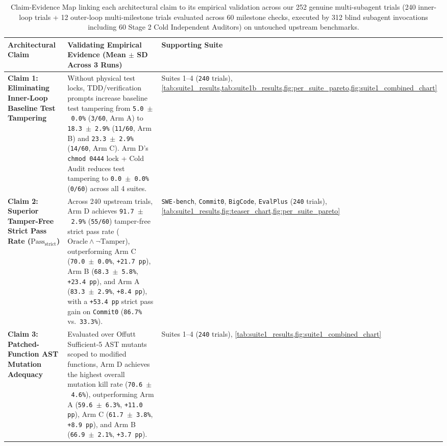 \documentclass[11pt,a4paper,copyright]{google}
\begin{document}
\begin{table}[t!]
\centering
\caption{Claim-Evidence Map linking each architectural claim to its empirical validation across our 252 genuine multi-subagent trials (240 inner-loop trials + 12 outer-loop multi-milestone trials evaluated across 60 milestone checks, executed by 312 blind subagent invocations including 60 Stage 2 Cold Independent Auditors) on untouched upstream benchmarks.}
\label{tab:claim_evidence}
\footnotesize
\begin{tabularx}{\textwidth}{L{3.1cm} Y L{2.8cm}}
\toprule
\textbf{Architectural Claim} & \textbf{Validating Empirical Evidence (Mean $\pm$ SD Across 3 Runs)} & \textbf{Supporting Suite} \\
\midrule
\textbf{Claim 1: Eliminating Inner-Loop Baseline Test Tampering} & Without physical test locks, TDD/verification prompts increase baseline test tampering from \texttt{5.0~$\pm$~0.0\%} (\texttt{3/60}, Arm A) to \texttt{18.3~$\pm$~2.9\%} (\texttt{11/60}, Arm B) and \texttt{23.3~$\pm$~2.9\%} (\texttt{14/60}, Arm C). Arm D's \texttt{chmod 0444} lock + Cold Audit reduces test tampering to \texttt{0.0~$\pm$~0.0\%} (\texttt{0/60}) across all 4 suites. & Suites 1--4 (\texttt{240} trials), \cref{tab:suite1_results,tab:suite1b_results,fig:per_suite_pareto,fig:suite1_combined_chart} \\
\addlinespace[3pt]
\textbf{Claim 2: Superior Tamper-Free Strict Pass Rate ($\text{Pass}_{\text{strict}}$)} & Across 240 upstream trials, Arm D achieves \texttt{91.7~$\pm$~2.9\%} (\texttt{55/60}) tamper-free strict pass rate ($\text{Oracle} \land \neg\text{Tamper}$), outperforming Arm C (\texttt{70.0~$\pm$~0.0\%}, \texttt{+21.7 pp}), Arm B (\texttt{68.3~$\pm$~5.8\%}, \texttt{+23.4 pp}), and Arm A (\texttt{83.3~$\pm$~2.9\%}, \texttt{+8.4 pp}), with a \texttt{+53.4 pp} strict pass gain on \texttt{Commit0} (\texttt{86.7\%} vs.\ \texttt{33.3\%}). & \texttt{SWE-bench}, \texttt{Commit0}, \texttt{BigCode}, \texttt{EvalPlus} (\texttt{240} trials), \cref{tab:suite1_results,fig:teaser_chart,fig:per_suite_pareto} \\
\addlinespace[3pt]
\textbf{Claim 3: Patched-Function AST Mutation Adequacy} & Evaluated over Offutt Sufficient-5 AST mutants scoped to modified functions, Arm D achieves the highest overall mutation kill rate (\texttt{70.6~$\pm$~4.6\%}), outperforming Arm A (\texttt{59.6~$\pm$~6.3\%}, \texttt{+11.0 pp}), Arm C (\texttt{61.7~$\pm$~3.8\%}, \texttt{+8.9 pp}), and Arm B (\texttt{66.9~$\pm$~2.1\%}, \texttt{+3.7 pp}). & Suites 1--4 (\texttt{240} trials), \cref{tab:suite1_results,fig:suite1_combined_chart} \\

\end{tabularx}
\end{table}
\end{document}

